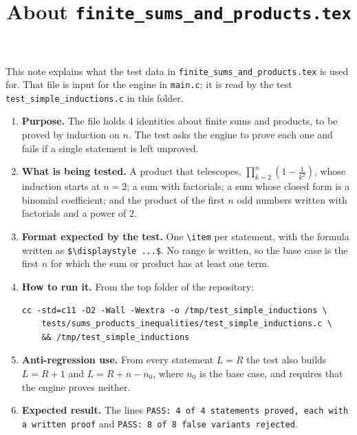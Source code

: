 \documentclass[11pt,a4paper]{article}
\title{About \texttt{finite\_sums\_and\_products.tex}}
\author{}
\date{}
\begin{document}
\maketitle
This note explains what the test data in \texttt{finite\_sums\_and\_products.tex} is used for. That file is input for the engine in \texttt{main.c}; it is read by the test \texttt{test\_simple\_inductions.c} in this folder.

\begin{enumerate}
\item \textbf{Purpose.} The file holds 4 identities about finite sums and products, to be proved by induction on $n$. The test asks the engine to prove each one and fails if a single statement is left unproved.

\item \textbf{What is being tested.} A product that telescopes, $\displaystyle \prod_{k=2}^{n} \left(1 - \frac{1}{k^{2}}\right)$, whose induction starts at $n = 2$; a sum with factorials; a sum whose closed form is a binomial coefficient; and the product of the first $n$ odd numbers written with factorials and a power of $2$.

\item \textbf{Format expected by the test.} One \texttt{\textbackslash item} per statement, with the formula written as \texttt{\$\textbackslash displaystyle ...\$}. No range is written, so the base case is the first $n$ for which the sum or product has at least one term.

\item \textbf{How to run it.} From the top folder of the repository:
\begin{verbatim}
cc -std=c11 -O2 -Wall -Wextra -o /tmp/test_simple_inductions \
    tests/sums_products_inequalities/test_simple_inductions.c \
    && /tmp/test_simple_inductions
\end{verbatim}

\item \textbf{Anti-regression use.} From every statement $L = R$ the test also builds $L = R + 1$ and $L = R + n - n_{0}$, where $n_{0}$ is the base case, and requires that the engine proves neither.

\item \textbf{Expected result.} The lines \texttt{PASS: 4 of 4 statements proved, each with a written proof} and \texttt{PASS: 8 of 8 false variants rejected}.
\end{enumerate}
\end{document}
